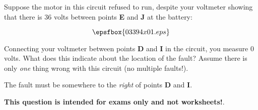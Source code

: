 

Suppose the motor in this circuit refused to run, despite your voltmeter showing that there is 36 volts between points {\bf E} and {\bf J} at the battery:

$$\epsfbox{03394x01.eps}$$

Connecting your voltmeter between points {\bf D} and {\bf I} in the circuit, you measure 0 volts.  What does this indicate about the location of the fault?  Assume there is only {\it one} thing wrong with this circuit (no multiple faults!).







The fault must be somewhere to the {\it right} of points {\bf D} and {\bf I}.







{\bf This question is intended for exams only and not worksheets!}.



